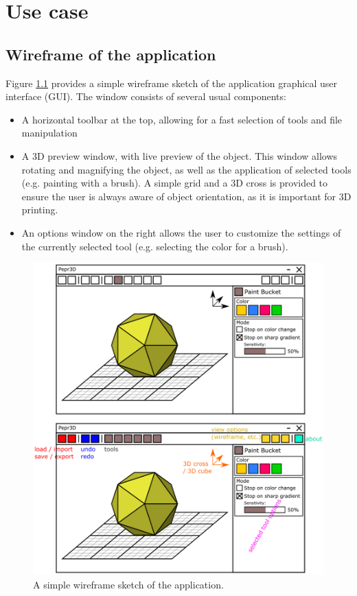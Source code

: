 \chapter{Use case}

\section{Wireframe of the application}\label{sec:wireframe}

Figure \ref{fig:wireframe} provides a simple wireframe sketch of the application graphical user interface (GUI). The window consists of several usual components:
\begin{itemize}
\item A horizontal toolbar at the top, allowing for a fast selection of tools and file manipulation
\item A 3D preview window, with live preview of the object. This window allows rotating and magnifying the object, as well as the application of selected tools (e.g. painting with a brush). A simple grid and a 3D cross is provided to ensure the user is always aware of object orientation, as it is important for 3D printing.
\item An options window on the right allows the user to customize the settings of the currently selected tool (e.g. selecting the color for a brush).
\end{itemize}

\hspace{-30pt}
\begin{figure}
	\centering
	\includegraphics[scale=0.35]{images/wireframe.png}
	\caption{A simple wireframe sketch of the application.}
	\label{fig:wireframe}
\end{figure}


